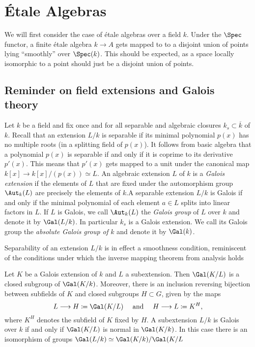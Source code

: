 \section{\'Etale Algebras}
We will first consider the case of \'etale algebras over a field $k$. Under the $\Spec$ functor, a finite \'etale algebra $k \to A$ gets mapped to to a disjoint union of points lying ``smoothly'' over $\Spec(k)$. This should be expected, as a space locally isomorphic to a point should just be a disjoint union of points.

\subsection{Reminder on field extensions and Galois theory}
\begin{construction}
	Let $k$ be a field and fix once and for all separable and algebraic closures $k_s \subset \overline{k}$ of $k$. Recall that an extension $L/k$ is separable if its minimal polynomial $p(x)$ has no multiple roots (in a splitting field of $p(x)$). It follows from basic algebra that a polynomial $p(x)$ is separable if and only if it is coprime to its derivative $p'(x)$. This means that $p'(x)$ gets mapped to a unit under the canonical map $k[x] \to k[x]/(p(x)) \simeq L$. An algebraic extension $L$ of $k$ is a \textit{Galois extension} if the elements of $L$ that are fixed under the automorphism group $\Aut_k(L)$ are precisely the elements of $k$.A separable extension $L/k$ is Galois if and only if the minimal polynomial of each element $a \in L$ splits into linear factors in $L$. If $L$ is Galois, we call $\Aut_k(L)$ the \textit{Galois group} of $L$ over $k$ and denote it by $\Gal(L/k)$. In particular $k_s$ is a Galois extension. We call its Galois group the \textit{absolute Galois group of $k$} and denote it by $\Gal(k)$.
\end{construction}


\begin{remark}
	Separability of an extension $L/k$ is in effect a smoothness condition, reminiscent of the conditions under which the inverse mapping theorem from analysis holds
\end{remark}

\begin{theorem}\label{theorem:galois}
	Let $K$ be a Galois extension of $k$ and $L$ a subextension. Then $\Gal(K/L)$ is a closed subgroup of $\Gal(K/k)$. Moreover, there is an inclusion reversing bijection between subfields of $K$ and closed subgroups $H \subset G$, given by the maps
	\[
		L \to H \coloneqq \Gal(K/L) \quad \text{ and } \quad H \to L \coloneqq K^H,
	\]
	where $K^H$ denotes the subfield of $K$ fixed by $H$. A subextension $L/k$ is Galois over $k$ if and only if $\Gal(K/L)$ is normal in $\Gal(K/k)$. In this case there is an isomorphism of groups $\Gal(L/k) \simeq \Gal(K/k)/\Gal(K/L$
\end{theorem}

